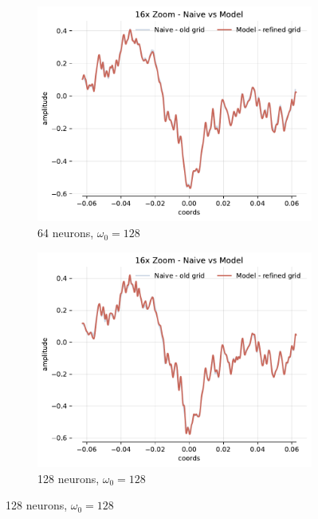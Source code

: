 \begin{figure}[h]
    \centering
    \begin{subfigure}[b]{0.32\textwidth}
        \centering
        \includegraphics[width=\textwidth]{img/ch4/16x-zoom-1hl-64hf-128hz.pdf}
        \caption{64 neurons, $\omega_0=128$}
        \label{fig:16x-zoom-1hl-64hf-128hz}
    \end{subfigure}
    \begin{subfigure}[b]{0.32\textwidth}
        \centering
        \includegraphics[width=\textwidth]{img/ch4/16x-zoom-1hl-128hf-128hz.pdf}
        \caption{128 neurons, $\omega_0=128$}
        \label{fig:16x-zoom-1hl-128hf-128hz}

\end{subfigure}
\end{figure}
